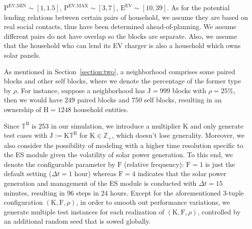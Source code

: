 \documentclass[journal]{IEEEtran}
\begin{document}
$\mathrm{P}^{\text{EV}, \text{MIN}} \sim [1, 1.5]$,
$\mathrm{P}^{\text{EV}, \text{MAX}} \sim [3, 7]$,
$\mathrm{E}^\text{EV} \sim [10, 39]$.
As for the potential lending relations between certain pairs of household, we assume
they are based on real social contacts, thus have been determined ahead-of-planning.
We assume different pairs do not have overlap so the blocks are separate.
Also, we assume that the household who can lend its EV charger is also a household which
owns solar panels.
\par
As mentioned in Section~\ref{section:two}, a neighborhood comprises some paired blocks
and other self blocks, where we denote the percentage of the former type by $\rho$.
For instance, suppose a neighborhood has $\textrm{J} = 999$ blocks with $\rho = 25\%$,
then we would have $249$ paired blocks and $750$ self blocks, resulting in an ownership of
$\textrm{H} = 1248$ household entities.
\par
Since $\mathbb{T}^\mathrm{B}$ is 253 in our simulation, we introduce
a multiplier $\mathrm{K}$ and only generate test cases with $\mathrm{J} := \mathrm{K}\mathbb{T}^\mathrm{B}$
for $\mathrm{K} \in \mathbb{Z}_+$, which doesn't lose generality.
Moreover, we also consider the possibility of modeling with a higher time resolution
specific to the ES module given the volatility of solar power generation.
To this end, we denote the configurable parameter by $\mathrm{F}$ (relative frequency):
$\mathrm{F} = 1$ is just the default setting ($\Delta t = 1$ hour) whereas $\mathrm{F} = 4$
indicates that the solar power generation and management of the ES module is conducted
with $\Delta t = 15$ minutes, resulting in $96$ steps in 24 hours.
Except for the aforementioned 3-tuple configuration $(\mathrm{K}, \mathrm{F}, \rho)$,
in order to smooth out performance variations, we generate multiple test instances for
each realization of $(\mathrm{K}, \mathrm{F}, \rho)$, controlled by an additional
random seed that is sowed globally.
\end{document}
